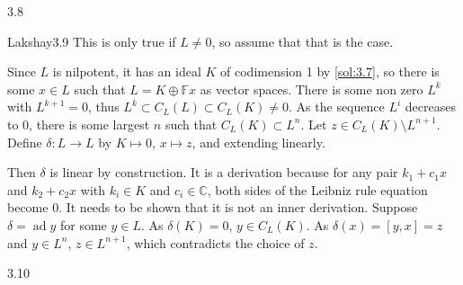\begin{solution}{}{3.8}

\end{solution}

\begin{solution}{Lakshay}{3.9}
    This is only true if $ L \neq 0 $, so assume that that is the case.

    Since $ L $ is nilpotent, it has an ideal $ K $ of codimension 1 by \cref{sol:3.7}, so there is some $ x\in L $ such that $ L = K \oplus \mathbb{F}x $ as vector spaces. There is some non zero $ L^{k} $ with $ L^{k+1} = 0 $, thus $ L^{k} \subset C_{L}(L) \subset C_{L}(K) \neq 0 $. As the sequence $ L^{i} $ decreases to 0, there is some largest $ n $ such that $ C_{L}(K) \subset L^{n} $. Let $ z\in C_{L}(K) \setminus L^{n+1} $. Define $ \delta: L\to L $ by $ K \mapsto 0 $, $ x \mapsto z $, and extending linearly.

    Then $ \delta $ is linear by construction. It is a derivation because for any pair $ k_{1}+c_{1}x $ and $ k_{2} + c_{2}x $ with $ k_{i} \in K $ and $ c_{i} \in \mathbb{C} $, both sides of the Leibniz rule equation become 0. It needs to be shown that it is not an inner derivation. Suppose $ \delta = \operatorname{ad}y $ for some $ y\in L $. As $ \delta(K) = 0 $, $ y \in C_{L}(K) $. As $ \delta(x) = [y, x] = z $ and $ y\in L^{n} $, $ z\in L^{n+1} $, which contradicts the choice of $ z $.
\end{solution}

\begin{solution}{}{3.10}

\end{solution}